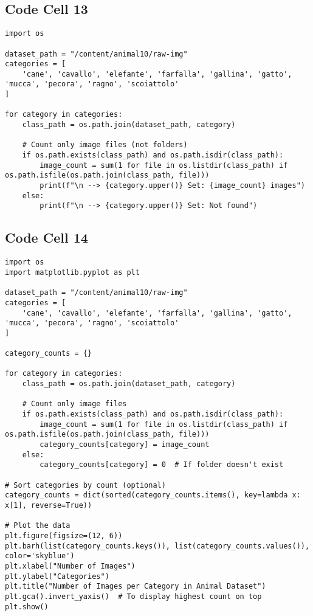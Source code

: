 \documentclass{article}
\begin{document}
\subsection*{Code Cell 13}
\begin{lstlisting}
import os

dataset_path = "/content/animal10/raw-img"
categories = [
    'cane', 'cavallo', 'elefante', 'farfalla', 'gallina', 'gatto', 'mucca', 'pecora', 'ragno', 'scoiattolo'
]

for category in categories:
    class_path = os.path.join(dataset_path, category)

    # Count only image files (not folders)
    if os.path.exists(class_path) and os.path.isdir(class_path):
        image_count = sum(1 for file in os.listdir(class_path) if os.path.isfile(os.path.join(class_path, file)))
        print(f"\n --> {category.upper()} Set: {image_count} images")
    else:
        print(f"\n --> {category.upper()} Set: Not found")
\end{lstlisting}

\subsection*{Code Cell 14}
\begin{lstlisting}
import os
import matplotlib.pyplot as plt

dataset_path = "/content/animal10/raw-img"
categories = [
    'cane', 'cavallo', 'elefante', 'farfalla', 'gallina', 'gatto', 'mucca', 'pecora', 'ragno', 'scoiattolo'
]

category_counts = {}

for category in categories:
    class_path = os.path.join(dataset_path, category)

    # Count only image files
    if os.path.exists(class_path) and os.path.isdir(class_path):
        image_count = sum(1 for file in os.listdir(class_path) if os.path.isfile(os.path.join(class_path, file)))
        category_counts[category] = image_count
    else:
        category_counts[category] = 0  # If folder doesn't exist

# Sort categories by count (optional)
category_counts = dict(sorted(category_counts.items(), key=lambda x: x[1], reverse=True))

# Plot the data
plt.figure(figsize=(12, 6))
plt.barh(list(category_counts.keys()), list(category_counts.values()), color='skyblue')
plt.xlabel("Number of Images")
plt.ylabel("Categories")
plt.title("Number of Images per Category in Animal Dataset")
plt.gca().invert_yaxis()  # To display highest count on top
plt.show()
\end{lstlisting}
\end{document}
